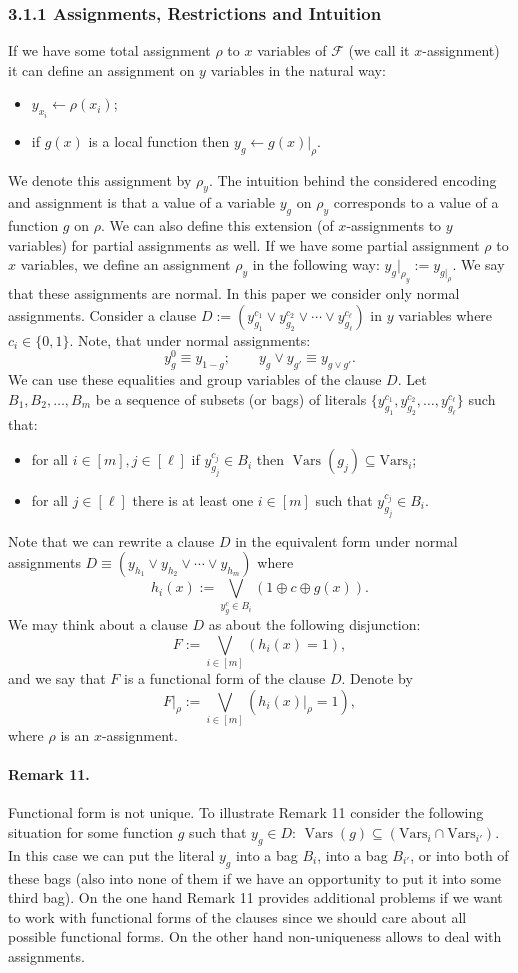 \documentclass[10pt,a4paper]{article}
\begin{document}
\subsubsection*{3.1.1 Assignments, Restrictions and Intuition}
If we have some total assignment $\rho$ to $x$ variables of $\mathcal F$ (we call it $x$-assignment) it can define an assignment on $y$ variables in the natural way:
\begin{itemize}
\item $y_{x_i}\leftarrow\rho(x_i)$;
\item if $g(x)$ is a local function then $y_g\leftarrow g(x)|_\rho$.
\end{itemize}
We denote this assignment by $\rho_y$. The intuition behind the considered encoding and assignment is that a value of a variable $y_g$ on $\rho_y$ corresponds to a value of a function $g$ on $\rho$.
We can also define this extension (of $x$-assignments to $y$ variables) for partial assignments as well. If we have some partial assignment $\rho$ to $x$ variables, we define an assignment $\rho_y$ in the following way: $y_g|_{\rho_y}:=y_{g|_\rho}$. We say that these assignments are normal. In this paper we consider only normal assignments.
Consider a clause $D:=(y_{g_1}^{c_1}\vee y_{g_2}^{c_2}\vee\cdots\vee y_{g_\ell}^{c_\ell})$ in $y$ variables where $c_i\in\{0,1\}$. Note, that under normal assignments:
\[y_g^0\equiv y_{1-g};\qquad y_g\vee y_{g'}\equiv y_{g\vee g'}.\]
We can use these equalities and group variables of the clause $D$. Let $B_1,B_2,\ldots,B_m$ be a sequence of subsets (or bags) of literals $\{y_{g_1}^{c_1},y_{g_2}^{c_2},\ldots,y_{g_\ell}^{c_\ell}\}$ such that:
\begin{itemize}
\item for all $i\in[m],j\in[\ell]$ if $y_{g_j}^{c_j}\in B_i$ then $\operatorname{Vars}(g_j)\subseteq\mathrm{Vars}_i$;
\item for all $j\in[\ell]$ there is at least one $i\in[m]$ such that $y_{g_j}^{c_j}\in B_i$.
\end{itemize}
Note that we can rewrite a clause $D$ in the equivalent form under normal assignments $D\equiv(y_{h_1}\vee y_{h_2}\vee\cdots\vee y_{h_m})$ where
\[h_i(x):=\bigvee_{y_g^c\in B_i}(1\oplus c\oplus g(x)).\]
We may think about a clause $D$ as about the following disjunction:
\[F:=\bigvee_{i\in[m]}(h_i(x)=1),\]
and we say that $F$ is a functional form of the clause $D$. Denote by
\[F|_\rho:=\bigvee_{i\in[m]}(h_i(x)|_\rho=1),\]
where $\rho$ is an $x$-assignment.
\paragraph{Remark 11.} Functional form is not unique.
To illustrate Remark 11 consider the following situation for some function $g$ such that $y_g\in D$: $\operatorname{Vars}(g)\subseteq(\mathrm{Vars}_i\cap\mathrm{Vars}_{i'})$. In this case we can put the literal $y_g$ into a bag $B_i$, into a bag $B_{i'}$, or into both of these bags (also into none of them if we have an opportunity to put it into some third bag).
On the one hand Remark 11 provides additional problems if we want to work with functional forms of the clauses since we should care about all possible functional forms. On the other hand non-uniqueness allows to deal with assignments.
\end{document}
